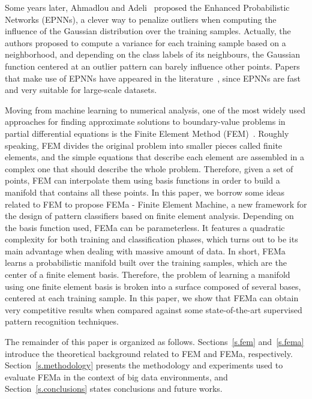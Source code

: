 Some years later, Ahmadlou and Adeli~\cite{AhmadlouICAE:10} proposed the Enhanced Probabilistic Networks (EPNNs), a clever way to penalize outliers when computing the influence of the Gaussian distribution over the training samples. Actually, the authors proposed to compute a variance for each training sample based on a neighborhood, and depending on the class labels of its neighbours, the Gaussian function centered at an outlier pattern can barely influence other points. Papers that make use of EPNNs have appeared in the literature~\cite{Sankari:11,Hirschauer:15}, since EPNNs are fast and very suitable for large-scale datasets.

Moving from machine learning to numerical analysis, one of the most widely used approaches for finding approximate solutions to boundary-value problems in partial differential equations is the Finite Element Method (FEM)~\cite{Zienkiewicz:67,YuJSE:93}. Roughly speaking, FEM divides the original problem into smaller pieces called finite elements, and the simple equations that describe each element are assembled in a complex one that should describe the whole problem. Therefore, given a set of points, FEM can interpolate them using basis functions in order to build a manifold that contains all these points. In this paper, we borrow some ideas related to FEM to propose FEMa - Finite Element Machine, a new framework for the design of pattern classifiers based on finite element analysis. Depending on the basis function used, FEMa can be parameterless. It features a quadratic complexity for both training and classification phases, which turns out to be its main advantage when dealing with massive amount of data. In short, FEMa learns a probabilistic manifold built over the training samples, which are the center of a finite element basis. Therefore, the problem of learning a manifold using one finite element basis is broken into a surface composed of several bases, centered at each training sample. In this paper, we show that FEMa can obtain very competitive results when compared against some state-of-the-art supervised pattern recognition techniques.

The remainder of this paper is organized as follows. Sections~\ref{s.fem} and~\ref{s.fema} introduce the theoretical background related to FEM and FEMa, respectively. Section~\ref{s.methodology} presents the methodology and experiments used to evaluate FEMa in the context of big data environments, and Section~\ref{s.conclusions} states conclusions and future works.